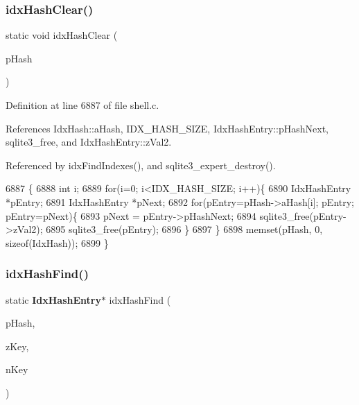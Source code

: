 \subsubsection{idx\+Hash\+Clear()}
{\footnotesize\ttfamily static void idx\+Hash\+Clear (\begin{DoxyParamCaption}\item[{\textbf{ Idx\+Hash} $\ast$}]{p\+Hash }\end{DoxyParamCaption})\hspace{0.3cm}{\ttfamily [static]}}



Definition at line 6887 of file shell.\+c.



References Idx\+Hash\+::a\+Hash, I\+D\+X\+\_\+\+H\+A\+S\+H\+\_\+\+S\+I\+ZE, Idx\+Hash\+Entry\+::p\+Hash\+Next, sqlite3\+\_\+free, and Idx\+Hash\+Entry\+::z\+Val2.



Referenced by idx\+Find\+Indexes(), and sqlite3\+\_\+expert\+\_\+destroy().


\begin{DoxyCode}
6887                                         \{
6888   \textcolor{keywordtype}{int} i;
6889   \textcolor{keywordflow}{for}(i=0; i<IDX_HASH_SIZE; i++)\{
6890     IdxHashEntry *pEntry;
6891     IdxHashEntry *pNext;
6892     \textcolor{keywordflow}{for}(pEntry=pHash->aHash[i]; pEntry; pEntry=pNext)\{
6893       pNext = pEntry->pHashNext;
6894       sqlite3_free(pEntry->zVal2);
6895       sqlite3_free(pEntry);
6896     \}
6897   \}
6898   memset(pHash, 0, \textcolor{keyword}{sizeof}(IdxHash));
6899 \}
\end{DoxyCode}
\mbox{\label{shell_8c_a9555c1511a6fbc3959309f9c8378f7e6}} 
\subsubsection{idx\+Hash\+Find()}
{\footnotesize\ttfamily static \textbf{ Idx\+Hash\+Entry}$\ast$ idx\+Hash\+Find (\begin{DoxyParamCaption}\item[{\textbf{ Idx\+Hash} $\ast$}]{p\+Hash,  }\item[{const char $\ast$}]{z\+Key,  }\item[{int}]{n\+Key }\end{DoxyParamCaption})\hspace{0.3cm}{\ttfamily [static]}}



